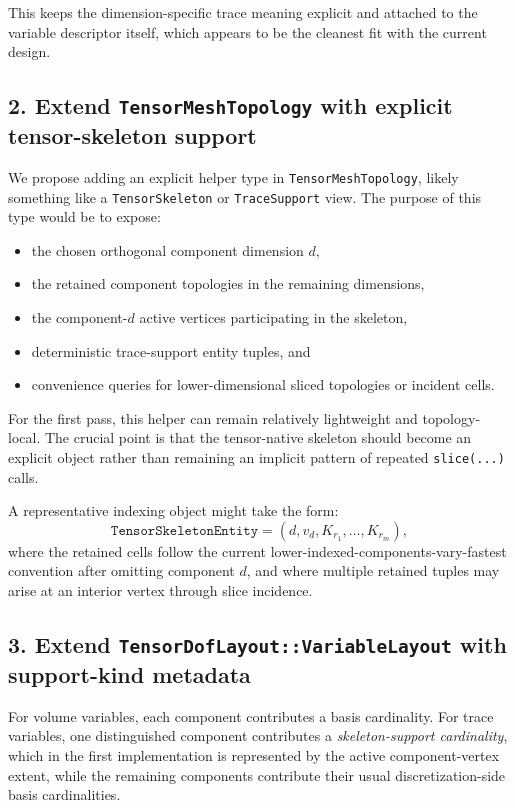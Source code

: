 \documentclass[11pt]{article}
\begin{document}
This keeps the dimension-specific trace meaning explicit and attached to the variable descriptor itself, which appears to be the cleanest fit with the current design.

\subsection{2. Extend \texttt{TensorMeshTopology} with explicit tensor-skeleton support}

We propose adding an explicit helper type in \texttt{TensorMeshTopology}, likely something like a \texttt{TensorSkeleton} or \texttt{TraceSupport} view. The purpose of this type would be to expose:
\begin{itemize}[leftmargin=2em]
  \item the chosen orthogonal component dimension $d$,
  \item the retained component topologies in the remaining dimensions,
  \item the component-$d$ active vertices participating in the skeleton,
  \item deterministic trace-support entity tuples, and
  \item convenience queries for lower-dimensional sliced topologies or incident cells.
\end{itemize}

For the first pass, this helper can remain relatively lightweight and topology-local. The crucial point is that the tensor-native skeleton should become an explicit object rather than remaining an implicit pattern of repeated \texttt{slice(...)} calls.

A representative indexing object might take the form:
\[
\texttt{TensorSkeletonEntity} = (d, v_d, K_{r_1}, \dots, K_{r_m}),
\]
where the retained cells follow the current lower-indexed-components-vary-fastest convention after omitting component $d$, and where multiple retained tuples may arise at an interior vertex through slice incidence.

\subsection{3. Extend \texttt{TensorDofLayout::VariableLayout} with support-kind metadata}

For volume variables, each component contributes a basis cardinality. For trace variables, one distinguished component contributes a \emph{skeleton-support cardinality}, which in the first implementation is represented by the active component-vertex extent, while the remaining components contribute their usual discretization-side basis cardinalities.
\end{document}
